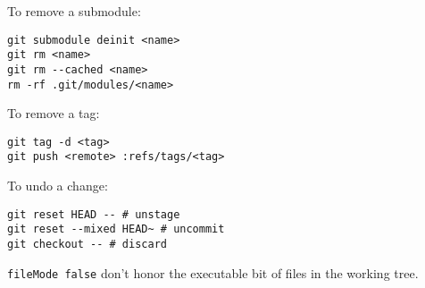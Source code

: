 \documentclass{charuun}
\begin{document}
To remove a submodule:
\begin{verbatim}
git submodule deinit <name>
git rm <name>
git rm --cached <name>
rm -rf .git/modules/<name>
\end{verbatim}

To remove a tag:
\begin{verbatim}
git tag -d <tag>
git push <remote> :refs/tags/<tag>
\end{verbatim}

To undo a change:
\begin{verbatim}
git reset HEAD -- # unstage
git reset --mixed HEAD~ # uncommit
git checkout -- # discard
\end{verbatim}


\texttt{fileMode false} don't honor the executable bit of files in the working tree.
\end{document}
